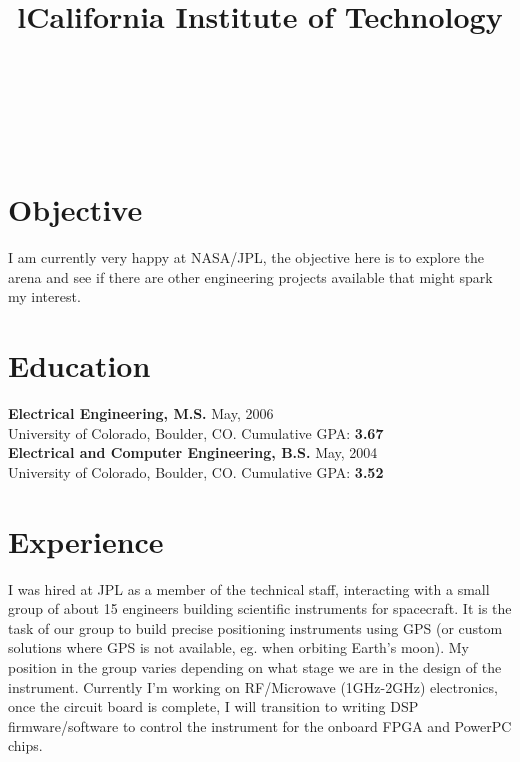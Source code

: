 \begin{resume}

\begin{format}
\title{l}\\
\\
\body\\
\end{format}

\section{\sc Objective}
I am currently very happy at NASA/JPL, the objective here is to explore the
arena and see if there are other engineering projects available that might
spark my interest. 
\section{\sc Education}
{\bf Electrical Engineering, M.S.} May, 2006\\
University of Colorado, Boulder, CO. \newline
Cumulative GPA: {\bf 3.67} \\

{\bf Electrical and Computer Engineering, B.S.} May, 2004\\
University of Colorado, Boulder, CO. \newline
Cumulative GPA: {\bf 3.52}\\



\section{\sc Experience}

\title{\bf California Institute of Technology}
\begin{position}
I was hired at JPL as a member of the technical staff, interacting with a small group of about 15 engineers building scientific instruments for spacecraft. It is the task of our group to build precise positioning instruments using GPS (or custom solutions where GPS is not available, eg. when orbiting Earth's moon). My position in the group varies depending on what stage we are in the design of the instrument. Currently I'm working on RF/Microwave (1GHz-2GHz) electronics, once the circuit board is complete, I will transition to writing DSP firmware/software to control the instrument for the onboard FPGA and PowerPC chips.
\end{position}


\end{resume}
